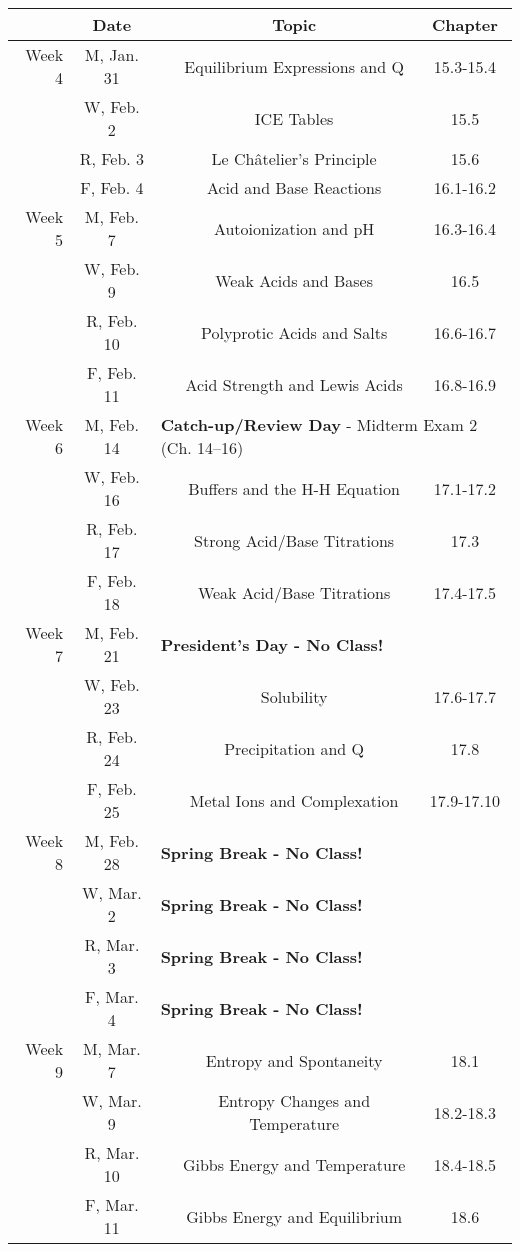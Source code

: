 \documentclass[12pt, letterpaper]{article}
\begin{document}
\begin{tabular}{rcccc}
	& Date && Topic & Chapter\\	
	\midrule
	Week 4 & M, Jan. 31&& Equilibrium Expressions and Q & 15.3-15.4\\
	& W, Feb. 2&& ICE Tables & 15.5\\
	& R, Feb. 3&& Le Ch\^atelier's Principle & 15.6\\
	& F, Feb. 4&& Acid and Base Reactions & 16.1-16.2\\
	\midrule
	Week 5 & M, Feb. 7&& Autoionization and pH & 16.3-16.4\\
	& W, Feb. 9&& Weak Acids and Bases & 16.5\\
	& R, Feb. 10&& Polyprotic Acids and Salts & 16.6-16.7\\
	& F, Feb. 11&& Acid Strength and Lewis Acids & 16.8-16.9\\
	\midrule
	Week 6 & M, Feb. 14& \multicolumn{3}{l}{\textbf{Catch-up/Review Day} - Midterm Exam 2 (Ch. 14--16)}\\
	& W, Feb. 16&& Buffers and the H-H Equation & 17.1-17.2\\
	& R, Feb. 17&& Strong Acid/Base Titrations & 17.3\\
	& F, Feb. 18&& Weak Acid/Base Titrations & 17.4-17.5\\
	\midrule
	Week 7 & M, Feb. 21& \multicolumn{3}{l}{\textbf{President's Day - No Class!}}\\
	& W, Feb. 23&& Solubility & 17.6-17.7\\
	& R, Feb. 24&& Precipitation and Q & 17.8\\
	& F, Feb. 25&& Metal Ions and Complexation & 17.9-17.10\\
	\midrule
	Week 8 & M, Feb. 28& \multicolumn{3}{l}{\textbf{Spring Break - No Class!}}\\
	& W, Mar. 2& \multicolumn{3}{l}{\textbf{Spring Break - No Class!}}\\
	& R, Mar. 3& \multicolumn{3}{l}{\textbf{Spring Break - No Class!}}\\
	& F, Mar. 4& \multicolumn{3}{l}{\textbf{Spring Break - No Class!}}\\
	\midrule
	Week 9 & M, Mar. 7&& Entropy and Spontaneity & 18.1\\
	& W, Mar. 9&& Entropy Changes and Temperature & 18.2-18.3\\
	& R, Mar. 10&& Gibbs Energy and Temperature & 18.4-18.5\\
	& F, Mar. 11&& Gibbs Energy and Equilibrium & 18.6\\
\end{tabular}
\end{document}
